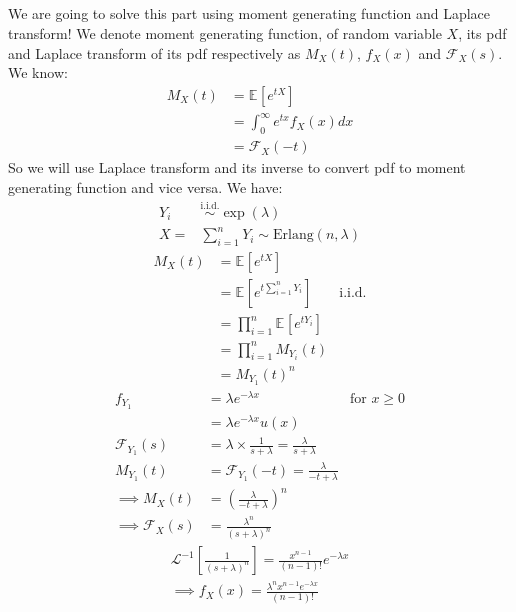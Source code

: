 \documentclass{article}
\numberwithin{equation}{section}
\newcommand{\EX}[2][]{\mathbb{E}_{#1}\left[#2\right]}%
\begin{document}
\subsection{}
We are going to solve this part using moment generating function and Laplace transform!
We denote moment generating function, of random variable \(X\), its pdf and Laplace transform of its pdf respectively as \(M_X(t)\), \(f_X(x)\) and \(\mathcal{F}_X(s)\).
We know:
\begin{align}
M_X(t) &= \EX{e^{tX}}\\
&= \int_0^\infty e^{tx} f_X(x) dx\\
&= \mathcal{F}_X(-t)
\end{align}
So we will use Laplace transform and its inverse to convert pdf to moment generating function and vice versa.
We have:
\begin{align}
Y_i &\stackrel{\text{i.i.d.}}{\sim}\exp(\lambda)\\
X = &\sum_{i=1}^n Y_i \sim \text{Erlang}(n, \lambda)
\end{align}
\begin{align}
M_X(t) &= \EX{e^{tX}}\\
&= \EX{e^{t\sum_{i=1}^n Y_i}} & \text{i.i.d.}\\
&= \prod_{i=1}^n \EX{e^{tY_i}}\\
&= \prod_{i=1}^n M_{Y_i}(t)\\
&= M_{Y_1}(t)^n
\end{align}
\begin{align}
f_{Y_1} &= \lambda e^{-\lambda x} & \text{for } x \ge 0\\
&= \lambda e^{-\lambda x}u(x)\\
\mathcal{F}_{Y_1}(s) &= \lambda \times \frac{1}{s + \lambda}= \frac{\lambda}{s + \lambda}\\
M_{Y_1}(t) &= \mathcal{F}_{Y_1}(-t) = \frac{\lambda}{-t + \lambda}\\
\implies M_X(t) &= (\frac{\lambda}{-t + \lambda})^n\\
\implies \mathcal{F}_X(s) &= \frac{\lambda^n}{(s + \lambda)^n}
\end{align}
\begin{align}
\mathcal{L}^{-1}\left[ \frac{1}{(s + \lambda)^n} \right] = \frac{x^{n-1}}{(n-1)!} e^{-\lambda x}\\
\implies f_X(x) = \frac{\lambda^n x^{n-1}e^{-\lambda x}}{(n-1)!}
\end{align}
\end{document}
